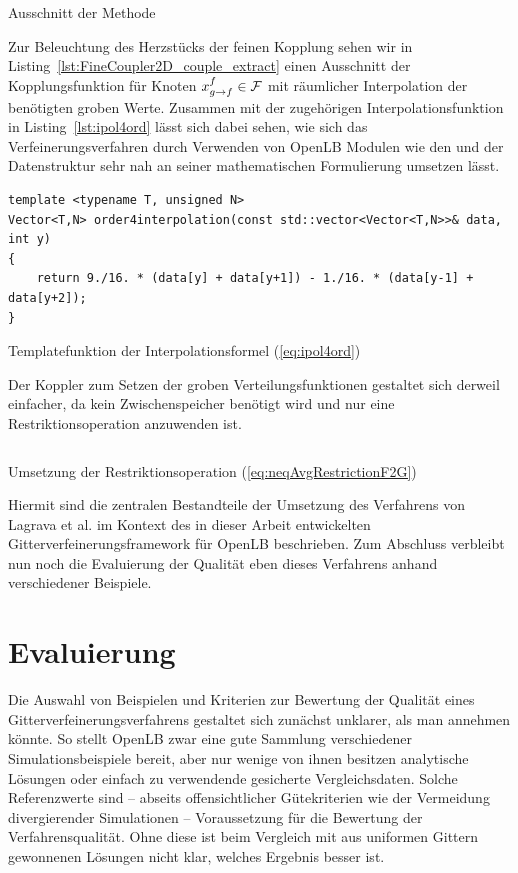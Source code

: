 \begin{listing}[H]
\inputminted{cpp}{code/fineCoupler2d_couple_extract.cpp}
\caption{Ausschnitt der Methode }
\label{lst:FineCoupler2D_couple_extract}
\end{listing}

Zur Beleuchtung des Herzstücks der feinen Kopplung sehen wir in Listing~\ref{lst:FineCoupler2D_couple_extract} einen Ausschnitt der Kopplungsfunktion für Knoten \(x_{g \to f}^f \in \mathcal{F}\) mit räumlicher Interpolation der benötigten groben Werte. Zusammen mit der zugehörigen Interpolationsfunktion in Listing~\ref{lst:ipol4ord} lässt sich dabei sehen, wie sich das Verfeinerungsverfahren durch Verwenden von OpenLB Modulen wie den  und der  Datenstruktur sehr nah an seiner mathematischen Formulierung umsetzen lässt.

\begin{listing}[H]
\begin{verbatim}
template <typename T, unsigned N>
Vector<T,N> order4interpolation(const std::vector<Vector<T,N>>& data, int y)
{
	return 9./16. * (data[y] + data[y+1]) - 1./16. * (data[y-1] + data[y+2]);
}
\end{verbatim}
\caption{Templatefunktion der Interpolationsformel (\ref{eq:ipol4ord})}
\label{lst:ipol4ord}
\end{listing}

Der Koppler  zum Setzen der groben Verteilungsfunktionen gestaltet sich derweil einfacher, da kein Zwischenspeicher benötigt wird und nur eine Restriktionsoperation anzuwenden ist.

\begin{listing}[H]
\inputminted{cpp}{code/computeRestrictedFneq.cpp}
\caption{Umsetzung der Restriktionsoperation (\ref{eq:neqAvgRestrictionF2G})}
\label{lst:CoarseCoupler2D_restriction}
\end{listing}

Hiermit sind die zentralen Bestandteile der Umsetzung des Verfahrens von Lagrava et al. im Kontext des in dieser Arbeit entwickelten Gitterverfeinerungsframework für OpenLB beschrieben. Zum Abschluss verbleibt nun noch die Evaluierung der Qualität eben dieses Verfahrens anhand verschiedener Beispiele.

\newpage
\section{Evaluierung}

Die Auswahl von Beispielen und Kriterien zur Bewertung der Qualität eines Gitterverfeinerungsverfahrens gestaltet sich zunächst unklarer, als man annehmen könnte. So stellt OpenLB zwar eine gute Sammlung verschiedener Simulationsbeispiele bereit, aber nur wenige von ihnen besitzen analytische Lösungen oder einfach zu verwendende gesicherte Vergleichsdaten. Solche Referenzwerte sind -- abseits offensichtlicher Gütekriterien wie der Vermeidung divergierender Simulationen -- Voraussetzung für die Bewertung der Verfahrensqualität. Ohne diese ist beim Vergleich mit aus uniformen Gittern gewonnenen Lösungen nicht klar, welches Ergebnis besser ist.

